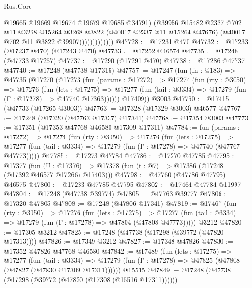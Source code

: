 \begin{lexlean}{RustCore}
\begin{coremodule}
                            @19665
                            @19669
                            @19674
                            @19679
                            @19685
                            @34791)
                          (@39956
                            @15482
                            @2337
                            @702
                            @11
                            @3268
                            @15264
                            @3268
                            @3822
                            (@40017 @2337 @11 @15264 @47676)
                            (@40017 @702 @11 @3822 @39907)))))))))))))
@47728 := @17231 @470
@47732 := @17233 (@17237 @470) (@17243 @470)
@47733 := @17252 @46574
@47735 := @17248 (@47733 @17267)
@47737 := @17290 (@17291 @470)
@47738 := @17286 @47737
@47740 := @17248 (@47738 @17316)
@47757 := @17247
    (fun (fn : @183) =>
    @47735
      (@17270
        (@17273
          (fun (params : @17272) =>
          @17274
            (fun (rty : @3050) =>
            @17276
              (fun (lets : @17275) =>
              @17277 (fun (tail : @3334) => @17279 (fun (Γ : @17278) => @47740 @17363))))))
        @17409))
    @3003
@47760 := @17415 (@47733 (@17265 @3003))
@47763 := @17328 (@17329 @3003) @46577
@47767 := @17248 (@17320 (@47763 @17337) @17341)
@47768 := @17354 @3003
@47773 := @17351 (@17353 @47768 @46580 @17309 @17311)
@47784 := fun (params : @17272) =>
  @17274
    (fun (rty : @3050) =>
    @17276
      (fun (lets : @17275) =>
      @17277 (fun (tail : @3334) => @17279 (fun (Γ : @17278) => @47740 (@47767 @47773)))))
@47785 := @17273 @47784
@47786 := @17270 @47785
@47795 := @17377
    (fun (U : @17376) => @17378 (fun (t : @7) => @17386 (@17248 (@17392 @46577 @17266) @17403)))
@47798 := @47760 (@47786 @47795) @46575
@47800 := @17233 @47785 @47795
@47802 := @17464 @47784 @11997
@47804 := @17248 (@47738 @39774)
@47805 := @47763 @39777
@47806 := @17320 @47805
@47808 := @17248 (@47806 @17341)
@47819 := @17467
    (fun (rty : @3050) =>
    @17276
      (fun (lets : @17275) =>
      @17277 (fun (tail : @3334) => @17279 (fun (Γ : @17278) => @47804 (@47808 @47773)))))
    @3212
@47820 := @17305 @3212
@47825 := @17248 (@47738 (@17298 (@39772 (@47820 @17313))))
@47826 := @17349 @3212
@47827 := @17348 @47826
@47830 := @17352 @47826 @47768 @46580
@47842 := @17489
    (fun (lets : @17275) =>
    @17277
      (fun (tail : @3334) =>
      @17279 (fun (Γ : @17278) => @47825 (@47808 (@47827 (@47830 @17309 @17311))))))
    @15515
@47849 := @17248 (@47738 (@17298 (@39772 (@47820 (@17308 (@15516 @17311))))))

\end{coremodule}
\end{lexlean}
